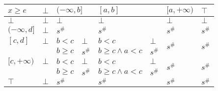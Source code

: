 \documentclass{article}
\begin{document}
\begin{table}[]
    \begin{tabular}{|l|l|ll|ll|l|l|}
    \hline
    $x \ge e$      & $\bot$ & \multicolumn{2}{l|}{$(-\infty, b]$} & \multicolumn{2}{l|}{$[a, b]$}  & $[a, +\infty)$          & $\top$                  \\ \hline
    $\bot$         & $\bot$ & \multicolumn{2}{l|}{$\bot$}         & \multicolumn{2}{l|}{$\bot$}    & $\bot$                  & $\bot$                  \\ \hline
    $(-\infty, d]$ & $\bot$ & \multicolumn{2}{l|}{$s^\#$}         & \multicolumn{2}{l|}{$s^\#$}    & $s^\#$                  & $s^\#$                  \\ \hline
    $[c, d]$       & $\bot$ & $b < c$            & $\bot$         & $b < c$               & $\bot$ & \multirow{2}{*}{$s^\#$} & \multirow{2}{*}{$s^\#$} \\
                   &        & $b \ge c$          & $s^\#$         & $b \ge c \land a < c$ & $s^\#$ &                         &                         \\ \hline
    $[c, +\infty)$ & $\bot$ & $b < c$            & $\bot$         & $b < c$               & $\bot$ & \multirow{2}{*}{$s^\#$} & \multirow{2}{*}{$s^\#$} \\
                   &        & $b \ge c$          & $s^\#$         & $b \ge c \land a < c$ & $s^\#$ &                         &                         \\ \hline
    $\top$         & $\bot$ & \multicolumn{2}{l|}{$s^\#$}         & \multicolumn{2}{l|}{$s^\#$}    & $s^\#$                  & $s^\#$                  \\ \hline
    \end{tabular}
    \end{table}
\end{document}
